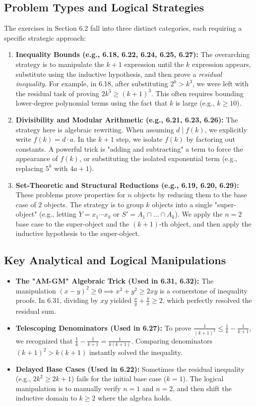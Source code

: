\documentclass[11pt, a4paper]{article}
\theoremstyle{definition}
\theoremstyle{remark}
\begin{document}
\subsection{Problem Types and Logical Strategies}
The exercises in Section 6.2 fall into three distinct categories, each requiring a specific strategic approach:
\begin{enumerate}
    \item \textbf{Inequality Bounds (e.g., 6.18, 6.22, 6.24, 6.25, 6.27):} 
    The overarching strategy is to manipulate the $k+1$ expression until the $k$ expression appears, substitute using the inductive hypothesis, and then prove a \textit{residual inequality}. For example, in 6.18, after substituting $2^k > k^3$, we were left with the residual task of proving $2k^3 \ge (k+1)^3$. This often requires bounding lower-degree polynomial terms using the fact that $k$ is large (e.g., $k \ge 10$).
    
    \item \textbf{Divisibility and Modular Arithmetic (e.g., 6.21, 6.23, 6.26):}
    The strategy here is algebraic rewriting. When assuming $d \mid f(k)$, we explicitly write $f(k) = d \cdot a$. In the $k+1$ step, we isolate $f(k)$ by factoring out constants. A powerful trick is "adding and subtracting" a term to force the appearance of $f(k)$, or substituting the isolated exponential term (e.g., replacing $5^k$ with $4a+1$).
    
    \item \textbf{Set-Theoretic and Structural Reductions (e.g., 6.19, 6.20, 6.29):}
    These problems prove properties for $n$ objects by reducing them to the base case of $2$ objects. The strategy is to group $k$ objects into a single "super-object" (e.g., letting $Y = x_1 \cdots x_k$ or $S' = A_1 \cap \dots \cap A_k$). We apply the $n=2$ base case to the super-object and the $(k+1)$-th object, and then apply the inductive hypothesis to the super-object.
\end{enumerate}

\subsection{Key Analytical and Logical Manipulations}
\begin{itemize}
    \item \textbf{The "AM-GM" Algebraic Trick (Used in 6.31, 6.32):} The manipulation $(x-y)^2 \ge 0 \implies x^2+y^2 \ge 2xy$ is a cornerstone of inequality proofs. In 6.31, dividing by $xy$ yielded $\frac{x}{y} + \frac{y}{x} \ge 2$, which perfectly resolved the residual sum.
    \item \textbf{Telescoping Denominators (Used in 6.27):} To prove $\frac{1}{(k+1)^2} \le \frac{1}{k} - \frac{1}{k+1}$, we recognized that $\frac{1}{k} - \frac{1}{k+1} = \frac{1}{k(k+1)}$. Comparing denominators $(k+1)^2 > k(k+1)$ instantly solved the inequality.
    \item \textbf{Delayed Base Cases (Used in 6.22):} Sometimes the residual inequality (e.g., $2k^2 \ge 2k+1$) fails for the initial base case ($k=1$). The logical manipulation is to manually verify $n=1$ and $n=2$, and then shift the inductive domain to $k \ge 2$ where the algebra holds.
\end{itemize}
\end{document}

